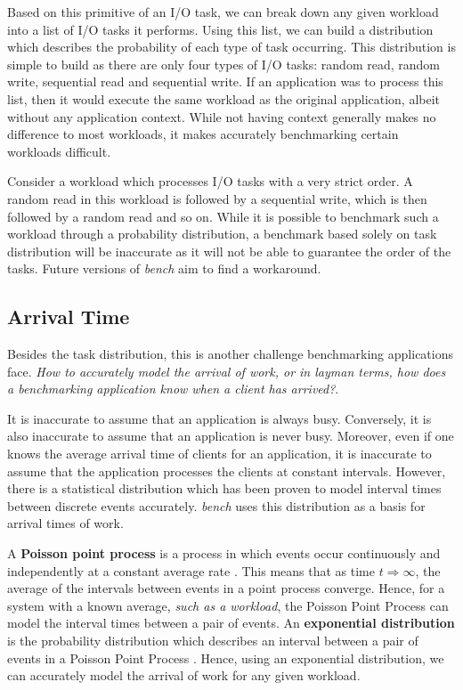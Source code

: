 \documentclass[10pt, author, twocolumn]{article}
\begin{document}
Based on this primitive of an I/O task, we can break down any given workload into a list of I/O tasks it performs. Using this list, we can build a distribution which describes the probability of each type of task occurring. This distribution is simple to build as there are only four types of I/O tasks: random read, random write, sequential read and sequential write. If an application was to process this list, then it would execute the same workload as the original application, albeit without any application context. While not having context generally makes no difference to most workloads, it makes accurately benchmarking certain workloads difficult.

Consider a workload which processes I/O tasks with a very strict order. A random read in this workload is followed by a sequential write, which is then followed by a random read and so on. While it is possible to benchmark such a workload through a probability distribution, a benchmark based solely on task distribution will be inaccurate as it will not be able to guarantee the order of the tasks. Future versions of \textit{bench} aim to find a workaround.

\subsection{Arrival Time}
Besides the task distribution, this is another challenge benchmarking applications face. \textit{How to accurately model the arrival of work, or in layman terms, how does a benchmarking application know when a client has arrived?}. 

It is inaccurate to assume that an application is always busy. Conversely, it is also inaccurate to assume that an application is never busy. Moreover, even if one knows the average arrival time of clients for an application, it is inaccurate to assume that the application processes the clients at constant intervals. However, there is a statistical distribution which has been proven to model interval times between discrete events accurately. \textit{bench} uses this distribution as a basis for arrival times of work. 

A \textbf{Poisson point process} is a process in which events occur continuously and independently at a constant average rate \cite{kingman1993poisson}. This means that as time $t \Rightarrow \infty$, the average of the intervals between events in a point process converge. Hence, for a system with a known average, \textit{such as a workload}, the Poisson Point Process can model the interval times between a pair of events. An \textbf{exponential distribution} is the probability distribution which describes an interval between a pair of events in a Poisson Point Process \cite{buzen1973computational}. Hence, using an exponential distribution, we can accurately model the arrival of work for any given workload.
\end{document}
